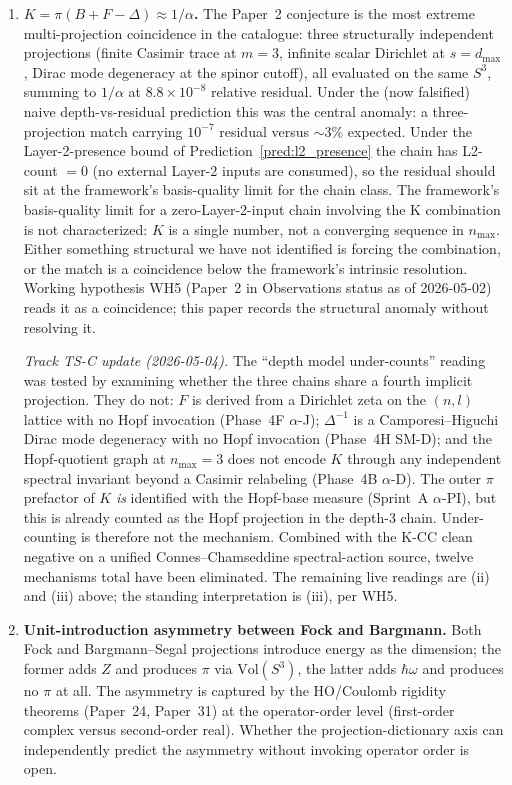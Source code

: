\documentclass[11pt]{article}
\begin{document}
\begin{enumerate}
\item \textbf{$K = \pi(B + F - \Delta) \approx 1/\alpha$.}
The Paper~2 conjecture is the most extreme multi-projection
coincidence in the catalogue: three structurally independent
projections (finite Casimir trace at $m=3$, infinite scalar
Dirichlet at $s = d_\text{max}$, Dirac mode degeneracy at the
spinor cutoff), all evaluated on the same $S^3$, summing to
$1/\alpha$ at $8.8 \times 10^{-8}$ relative residual.  Under
the (now falsified) naive depth-vs-residual prediction this was
the central anomaly: a three-projection match carrying
$10^{-7}$ residual versus $\sim 3\%$ expected.  Under the
Layer-2-presence bound of Prediction~\ref{pred:l2_presence} the
chain has L2-count $= 0$ (no external Layer-2 inputs are consumed),
so the residual should sit at the framework's basis-quality limit
for the chain class.  The framework's basis-quality limit for a
zero-Layer-2-input chain involving the K combination is not
characterized: $K$ is a single number, not a converging sequence
in $n_\text{max}$.  Either something structural we have not
identified is forcing the combination, or the match is a
coincidence below the framework's intrinsic resolution.  Working
hypothesis WH5 (Paper~2 in Observations status as of 2026-05-02)
reads it as a coincidence; this paper records the structural
anomaly without resolving it.

\textit{Track TS-C update (2026-05-04).} The ``depth model
under-counts'' reading was tested by examining whether the three
chains share a fourth implicit projection.  They do not: $F$ is
derived from a Dirichlet zeta on the $(n,l)$ lattice with no Hopf
invocation (Phase~4F $\alpha$-J); $\Delta^{-1}$ is a
Camporesi--Higuchi Dirac mode degeneracy with no Hopf invocation
(Phase~4H SM-D); and the Hopf-quotient graph at $n_{\max} = 3$ does
not encode $K$ through any independent spectral invariant beyond
a Casimir relabeling (Phase~4B $\alpha$-D).  The outer $\pi$
prefactor of $K$ \emph{is} identified with the Hopf-base measure
(Sprint~A $\alpha$-PI), but this is already counted as the Hopf
projection in the depth-3 chain.  Under-counting is therefore not
the mechanism.  Combined with the K-CC clean negative on a unified
Connes--Chamseddine spectral-action source, twelve mechanisms total
have been eliminated.  The remaining live readings are (ii) and
(iii) above; the standing interpretation is (iii), per WH5.

\item \textbf{Unit-introduction asymmetry between Fock and Bargmann.}
Both Fock and Bargmann--Segal projections introduce energy as the
dimension; the former adds $Z$ and produces $\pi$ via
$\mathrm{Vol}(S^3)$, the latter adds $\hbar\omega$ and produces
no $\pi$ at all.  The asymmetry is captured by the HO/Coulomb
rigidity theorems (Paper~24, Paper~31) at the operator-order level
(first-order complex versus second-order real).  Whether the
projection-dictionary axis can independently predict the asymmetry
without invoking operator order is open.


\end{enumerate}
\end{document}

